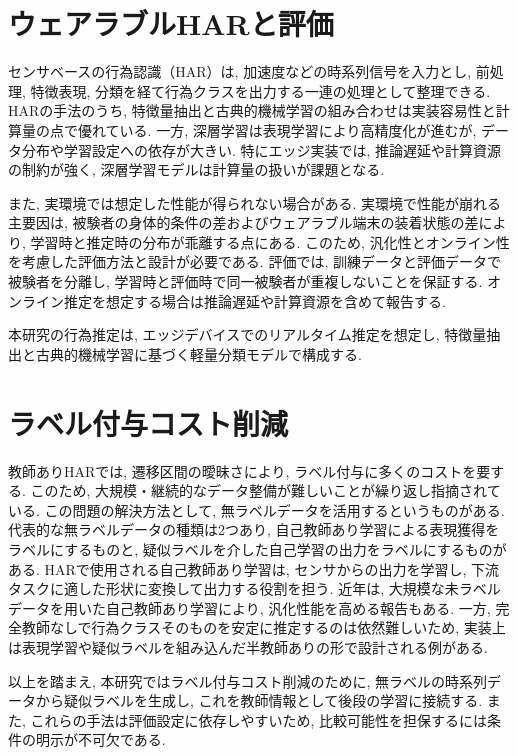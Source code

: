 \documentclass[a4paper,12pt]{jreport}
\begin{document}
\section{ウェアラブルHARと評価}
センサベースの行為認識（HAR）は, 加速度などの時系列信号を入力とし, 前処理, 特徴表現, 分類を経て行為クラスを出力する一連の処理として整理できる. HARの手法のうち, 特徴量抽出と古典的機械学習の組み合わせは実装容易性と計算量の点で優れている. 一方, 深層学習は表現学習により高精度化が進むが, データ分布や学習設定への依存が大きい. 特にエッジ実装では, 推論遅延や計算資源の制約が強く, 深層学習モデルは計算量の扱いが課題となる.

また, 実環境では想定した性能が得られない場合がある. 実環境で性能が崩れる主要因は, 被験者の身体的条件の差およびウェアラブル端末の装着状態の差により, 学習時と推定時の分布が乖離する点にある. このため, 汎化性とオンライン性を考慮した評価方法と設計が必要である. 評価では, 訓練データと評価データで被験者を分離し, 学習時と評価時で同一被験者が重複しないことを保証する. オンライン推定を想定する場合は推論遅延や計算資源を含めて報告する.

本研究の行為推定は, エッジデバイスでのリアルタイム推定を想定し, 特徴量抽出と古典的機械学習に基づく軽量分類モデルで構成する.

\section{ラベル付与コスト削減}
教師ありHARでは, 遷移区間の曖昧さにより, ラベル付与に多くのコストを要する. このため, 大規模・継続的なデータ整備が難しいことが繰り返し指摘されている. この問題の解決方法として, 無ラベルデータを活用するというものがある. 代表的な無ラベルデータの種類は2つあり, 自己教師あり学習による表現獲得をラベルにするものと, 疑似ラベルを介した自己学習の出力をラベルにするものがある. HARで使用される自己教師あり学習は, センサからの出力を学習し, 下流タスクに適した形状に変換して出力する役割を担う. 近年は, 大規模な未ラベルデータを用いた自己教師あり学習により, 汎化性能を高める報告もある. 一方, 完全教師なしで行為クラスそのものを安定に推定するのは依然難しいため, 実装上は表現学習や疑似ラベルを組み込んだ半教師ありの形で設計される例がある.

以上を踏まえ, 本研究ではラベル付与コスト削減のために, 無ラベルの時系列データから疑似ラベルを生成し, これを教師情報として後段の学習に接続する. また, これらの手法は評価設定に依存しやすいため, 比較可能性を担保するには条件の明示が不可欠である.
\end{document}
